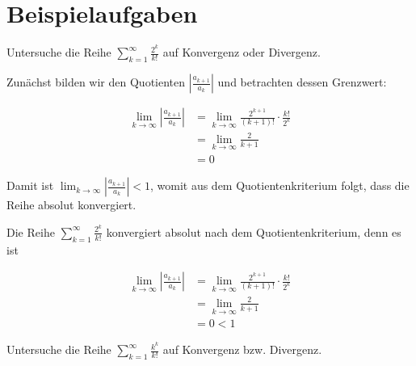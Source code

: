 \documentclass[fontsize=9pt,
               parskip=half-,
               DIV=14,
               listof=chapterentry,
               tocflat]{scrbook}
\begin{document}
\section{Beispielaufgaben}

\begin{exercise*}
Untersuche die Reihe $\sum _{k=1}^{\infty }{\frac {2^{k}}{k!}}$ auf Konvergenz oder Divergenz.

\end{exercise*}

\begin{solutionprocess*}
Zunächst bilden wir den Quotienten $\left|{\tfrac {a_{k+1}}{a_{k}}}\right|$ und betrachten dessen Grenzwert:

\begin{align*}
\lim _{k\to \infty }\left|{\frac {a_{k+1}}{a_{k}}}\right|&=\lim _{k\to \infty }{\frac {2^{k+1}}{(k+1)!}}\cdot {\frac {k!}{2^{k}}}\\[0.5em]&=\lim _{k\to \infty }{\frac {2}{k+1}}\\[0.5em]&=0
\end{align*}

Damit ist $\lim _{k\to \infty }\left|{\tfrac {a_{k+1}}{a_{k}}}\right|<1$, womit aus dem Quotientenkriterium folgt, dass die Reihe absolut konvergiert.

\end{solutionprocess*}

\begin{proof*}
Die Reihe $\sum _{k=1}^{\infty }{\frac {2^{k}}{k!}}$ konvergiert absolut nach dem Quotientenkriterium, denn es ist

\begin{align*}
\lim _{k\to \infty }\left|{\frac {a_{k+1}}{a_{k}}}\right|&=\lim _{k\to \infty }{\frac {2^{k+1}}{(k+1)!}}\cdot {\frac {k!}{2^{k}}}\\[0.5em]&=\lim _{k\to \infty }{\frac {2}{k+1}}\\[0.5em]&=0<1
\end{align*}

\end{proof*}

\begin{exercise*}
Untersuche die Reihe $\sum _{k=1}^{\infty }{\frac {k^{k}}{k!}}$ auf Konvergenz bzw. Divergenz.

\end{exercise*}
\end{document}
